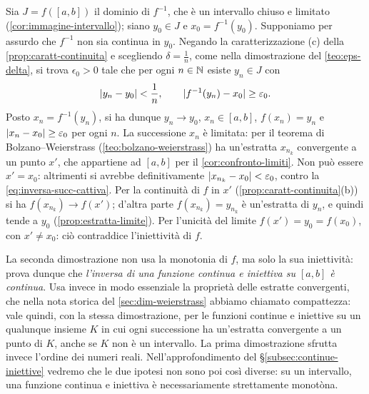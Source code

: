 \begin{dimostrazione}
Sia $J=f([a,b])$ il dominio di $f^{-1}$, che è un intervallo chiuso e limitato
(\cref{cor:immagine-intervallo}); siano $y_{0}\in J$ e $x_{0}=f^{-1}(y_{0})$. Supponiamo per
assurdo che $f^{-1}$ non sia continua in $y_{0}$. Negando la caratterizzazione (c) della
\cref{prop:caratt-continuita} e scegliendo $\delta=\frac1n$, come nella dimostrazione del
\cref{teo:eps-delta}, si trova $\epsilon_{0}>0$ tale che per ogni $n\in\mathbb{N}$ esiste
$y_{n}\in J$ con
\begin{equation}\label{eq:inversa-succ-cattiva}
  \lvert y_{n}-y_{0}\rvert<\frac1n, \qquad \lvert f^{-1}(y_{n})-x_{0}\rvert\ge\varepsilon_{0} .
\end{equation}
Posto $x_{n}=f^{-1}(y_{n})$, si ha dunque $y_{n}\to y_{0}$, $x_{n}\in[a,b]$,
$f(x_{n})=y_{n}$ e $\lvert x_{n}-x_{0}\rvert\ge\varepsilon_{0}$ per ogni $n$. La successione
$x_{n}$ è limitata: per il teorema di Bolzano--Weierstrass (\cref{teo:bolzano-weierstrass})
ha un'estratta $x_{n_{k}}$ convergente a un punto $x'$, che appartiene ad $[a,b]$ per il
\cref{cor:confronto-limiti}. Non può essere $x'=x_{0}$: altrimenti si avrebbe
definitivamente $\lvert x_{n_{k}}-x_{0}\rvert<\varepsilon_{0}$, contro la
\eqref{eq:inversa-succ-cattiva}. Per la continuità di $f$ in $x'$
(\cref{prop:caratt-continuita}(b)) si ha $f(x_{n_{k}})\to f(x')$; d'altra parte
$f(x_{n_{k}})=y_{n_{k}}$ è un'estratta di $y_{n}$, e quindi tende a $y_{0}$
(\cref{prop:estratta-limite}). Per l'unicità del limite $f(x')=y_{0}=f(x_{0})$, con
$x'\neq x_{0}$: ciò contraddice l'iniettività di $f$.
\end{dimostrazione}

\begin{osservazione}\label{oss:inversa-compattezza}
La seconda dimostrazione non usa la monotonia di $f$, ma solo la sua iniettività: prova
dunque che \emph{l'inversa di una funzione continua e iniettiva su $[a,b]$ è continua}.
Usa invece in modo essenziale la proprietà delle estratte convergenti, che nella nota
storica del \cref{sec:dim-weierstrass} abbiamo chiamato compattezza: vale quindi, con
la stessa dimostrazione, per le funzioni continue e iniettive su un qualunque insieme $K$
in cui ogni successione ha un'estratta convergente a un punto di $K$, anche se $K$ non è
un intervallo. La prima dimostrazione sfrutta invece l'ordine dei numeri reali.
Nell'approfondimento del \S\ref{subsec:continue-iniettive} vedremo che le due ipotesi
non sono poi così diverse: su un intervallo, una funzione continua e iniettiva è
necessariamente strettamente monotòna.
\end{osservazione}

